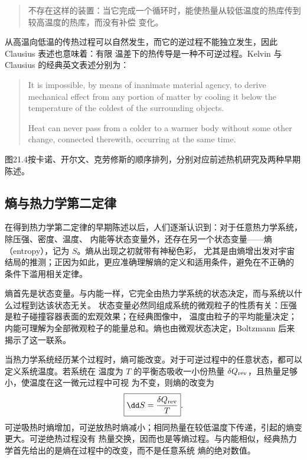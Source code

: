 \begin{quote}\small
不存在这样的装置：当它完成一个循环时，能使热量从较低温度的热库传到较高温度的热库，而没有补偿
变化。
\end{quote}

从高温向低温的传热过程可以自然发生，而它的逆过程不能独立发生，因此 Clausius 表述也意味着：有限
温差下的热传导是一种不可逆过程。Kelvin 与 Clausius 的经典英文表述分别为：
\begin{quote}\footnotesize
It is impossible, by means of inanimate material agency, to derive mechanical effect from any portion of
matter by cooling it below the temperature of the coldest of the surrounding objects.

Heat can never pass from a colder to a warmer body without some other change, connected therewith,
occurring at the same time.
\end{quote}

\foundersPortraitFigure
{}
图21.4按卡诺、开尔文、克劳修斯的顺序排列，分别对应前述热机研究及两种早期陈述。

\subsection*{熵与热力学第二定律}

在得到热力学第二定律的早期陈述以后，人们逐渐认识到：对于任意热力学系统，除压强、密度、温度、
内能等状态变量外，还存在另一个状态变量——熵（entropy），记为 $S$。熵从出现之初就带有神秘色彩，
尤其是由熵增出发对宇宙结局的推测；正因为如此，更应准确理解熵的定义和适用条件，避免在不正确的
条件下滥用相关定律。

熵首先是状态变量。与内能一样，它完全由热力学系统的状态决定，而与系统以什么过程到达该状态无关。
状态变量必然同组成系统的微观粒子的性质有关：压强是粒子碰撞容器表面的宏观效果；在经典图像中，
温度由粒子的平均能量决定；内能可理解为全部微观粒子的能量总和。熵也由微观状态决定，Boltzmann 后来
揭示了这一联系。

当热力学系统经历某个过程时，熵可能改变。对于可逆过程中的任意状态，都可以定义系统温度。若系统在
温度为 $T$ 的平衡态吸收一小份热量 $\delta Q_{\rm rev}$，且热量足够小，使温度在这一微元过程中可视
为不变，则熵的改变为
\begin{equation}
  \boxed{\dd S=\frac{\delta Q_{\rm rev}}{T}}.
\end{equation}
可逆吸热时熵增加，可逆放热时熵减小；相同热量在较低温度下传递，引起的熵变更大。可逆绝热过程没有
热量交换，因而也是等熵过程。与内能相似，经典热力学首先给出的是熵在过程中的改变，而不是任意系统
熵的绝对数值。

